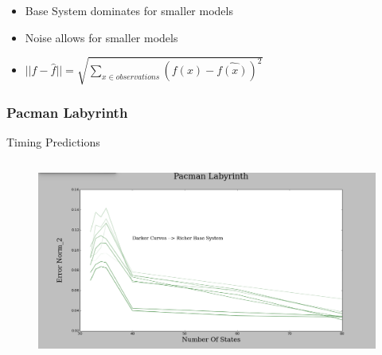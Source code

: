 \documentclass{beamer}
\begin{document}
\begin{frame}
\begin{columns}[c]
\end{columns}

\begin{itemize}
\item Base System dominates for smaller models
\item Noise allows for smaller models

\item[] $||f - \hat{f}|| = \sqrt{\sum\nolimits_{x \in observations}(f(x) - \hat{f(x)})^2}$ 
\end{itemize}

\end{frame}



\begin{frame}
\frametitle{Pacman Labyrinth}



\hspace{1cm} Timing Predictions

\begin{columns}[c]

\begin{figure}
\includegraphics[width=1.0\linewidth]{lucasplots/monImages/PacmanLabyrinth.png}
\end{figure}



\end{columns}
\end{frame}
\end{document}
